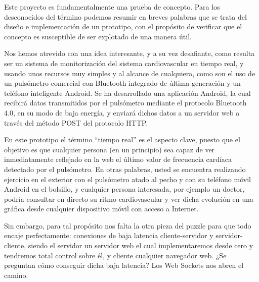 

\label{sec:intro:obj}
	Este proyecto es fundamentalmente una prueba de concepto. Para los desconocidos del término podemos resumir en breves palabras que se trata del diseño e implementación de un prototipo, con el propósito de verificar que el concepto es susceptible de ser explotado de una manera útil.
	
	Nos hemos atrevido con una idea interesante, y a su vez desafiante, como resulta ser un sistema de monitorización del sistema cardiovascular en tiempo real, y usando unos recursos muy simples y al alcance de cualquiera, como son el uso de un pulsómetro comercial con Bluetooth integrado de última generación y un teléfono inteligente Android. Se ha desarrollado una aplicación Android, la cual recibirá datos transmitidos por el pulsómetro mediante el protocolo Bluetooth 4.0, en su modo de baja energía, y enviará dichos datos a un servidor web a través del método POST del protocolo HTTP.
	
	En este prototipo el término ``tiempo real'' es el aspecto clave, puesto que el objetivo es que cualquier persona (en un principio) sea capaz de ver inmediatamente reflejado en la web el último valor de frecuencia cardíaca detectado por el pulsómetro. En otras palabras, usted se encuentra realizando ejercicio en el exterior con el pulsómetro atado al pecho y con su teléfono móvil Android en el bolsillo, y cualquier persona interesada, por ejemplo un doctor, podría consultar en directo su ritmo cardiovascular y ver dicha evolución en una gráfica desde cualquier dispositivo móvil con acceso a Internet.
	
	Sin embargo, para tal propósito nos falta la otra pieza del puzzle para que todo encaje perfectamente: conexiones de baja latencia cliente-servidor y servidor-cliente, siendo el servidor un servidor web el cual implementaremos desde cero y tendremos total control sobre él, y cliente cualquier navegador web. ¿Se preguntan cómo conseguir dicha baja latencia? Los Web Sockets nos abren el camino.
	
